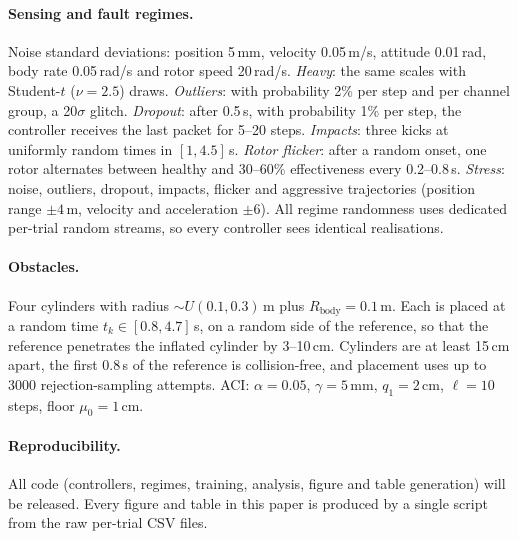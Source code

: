 \paragraph{Sensing and fault regimes.}
Noise standard deviations: position 5\,mm, velocity 0.05\,m/s, attitude 0.01\,rad, body rate 0.05\,rad/s and rotor speed 20\,rad/s. \emph{Heavy}: the same scales with Student-$t$ ($\nu{=}2.5$) draws.
\emph{Outliers}: with probability 2\% per step and per channel group, a 20$\sigma$ glitch.
\emph{Dropout}: after 0.5\,s, with probability 1\% per step, the controller receives the last packet for 5--20 steps.
\emph{Impacts}: three kicks at uniformly random times in $[1,4.5]$\,s.
\emph{Rotor flicker}: after a random onset, one rotor alternates between healthy and 30--60\% effectiveness every 0.2--0.8\,s.
\emph{Stress}: noise, outliers, dropout, impacts, flicker and aggressive trajectories (position range $\pm4$\,m, velocity and acceleration $\pm6$).
All regime randomness uses dedicated per-trial random streams, so every controller sees identical realisations.

\paragraph{Obstacles.}
Four cylinders with radius $\sim U(0.1,0.3)$\,m plus $R_{\mathrm{body}}=0.1$\,m. Each is placed at a random time $t_k\in[0.8,4.7]$\,s, on a random side of the reference, so that the reference penetrates the inflated cylinder by 3--10\,cm. Cylinders are at least 15\,cm apart, the first 0.8\,s of the reference is collision-free, and placement uses up to 3000 rejection-sampling attempts.
ACI: $\alpha{=}0.05$, $\gamma{=}5$\,mm, $q_1{=}2$\,cm, $\ell{=}10$ steps, floor $\mu_0{=}1$\,cm.

\paragraph{Reproducibility.}
All code (controllers, regimes, training, analysis, figure and table generation) will be released. Every figure and table in this paper is produced by a single script from the raw per-trial CSV files.
